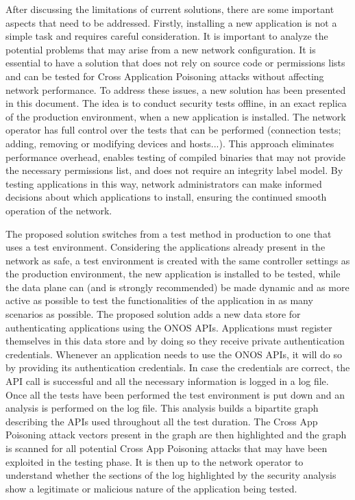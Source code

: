 {%
After discussing the limitations of current solutions, there are some important aspects that need to be addressed. Firstly, installing a new application is not a simple task and requires careful consideration. It is important to analyze the potential problems that may arise from a new network configuration. It is essential to have a solution that does not rely on source code or permissions lists and can be tested for Cross Application Poisoning attacks without affecting network performance. To address these issues, a new solution has been presented in this document. The idea is to conduct security tests offline, in an exact replica of the production environment, when a new application is installed. The network operator has full control over the tests that can be performed (connection tests; adding, removing or modifying devices and hosts...). This approach eliminates performance overhead, enables testing of compiled binaries that may not provide the necessary permissions list, and does not require an integrity label model. By testing applications in this way, network administrators can make informed decisions about which applications to install, ensuring the continued smooth operation of the network.

The proposed solution switches from a test method in production to one that uses a test environment. Considering the applications already present in the network as safe, a test environment is created with the same controller settings as the production environment, the new application is installed to be tested, while the data plane can (and is strongly recommended) be made dynamic and as more active as possible to test the functionalities of the application in as many scenarios as possible. The proposed solution adds a new data store for authenticating applications using the ONOS APIs. Applications must register themselves in this data store and by doing so they receive private authentication credentials. Whenever an application needs to use the ONOS APIs, it will do so by providing its authentication credentials. In case the credentials are correct, the API call is successful and all the necessary information is logged in a log file. Once all the tests have been performed the test environment is put down and an analysis is performed on the log file. This analysis builds a bipartite graph describing the APIs used throughout all the test duration. The Cross App Poisoning attack vectors present in the graph are then highlighted and the graph is scanned for all potential Cross App Poisoning attacks that may have been exploited in the testing phase. It is then up to the network operator to understand whether the sections of the log highlighted by the security analysis show a legitimate or malicious nature of the application being tested.
\medskip

}
